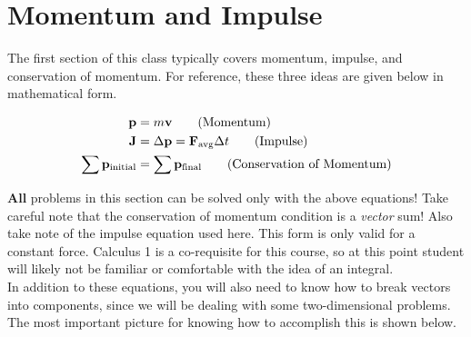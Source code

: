 \pgfplotsset{compat=1.18}

\chapter{Momentum and Impulse}

The first section of this class typically covers momentum, impulse, and 
conservation of momentum.  For reference, these three ideas are given below
in mathematical form.

\begin{align}
    \mathbf{p} &= m\mathbf{v} \tag{Momentum} \\
    \mathbf{J} &= \Delta \mathbf{p} = \mathbf{F}_{\text{avg}}\Delta t \tag{Impulse} \\
    \sum \mathbf{p}_{\text{initial}} &= \sum \mathbf{p}_{\text{final}} \tag{Conservation of Momentum}
\end{align}


\textbf{All} problems in this section can be solved only with the above equations! 
Take careful note that the conservation of momentum condition is a \textit{vector} sum! Also take note
of the impulse equation used here. This form is only valid for a constant force.  Calculus 1
is a co-requisite for this course, so at this point student will likely not be familiar
or comfortable with the idea of an integral.\\

In addition to these equations, you will also need to know how to break vectors into components, 
since we will be dealing with some two-dimensional problems. The most important picture
for knowing how to accomplish this is shown below. \\

\vspace{2em}

\begin{center}
\end{center}

